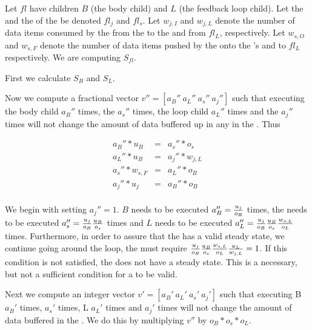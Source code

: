Let {\feedbackloop} $fl$ have children $B$ (the body child) and
$L$ (the feedback loop child). Let the {\joiner} and the
{\splitter} of the {\feedbackloop} be denoted $fl_j$ and $fl_s$.
Let $w_{j,I}$ and $w_{j,L}$ denote the number of data items
consumed by the {\joiner} from the {\Input} {\Channel} to the
{\feedbackloop} and from $fl_L$, respectively.  Let $w_{s,O}$ and
$w_{s,F}$ denote the number of data items pushed by the
{\splitter} onto the {\feedbackloop}'s {\Input} {\Channel} and
to $fl_L$ respectively.  We are computing $S_{fl}$.

First we calculate $S_{B}$ and $S_{L}$.

Now we compute a fractional vector $v'' = [a_B''\ a_L''\ a_s''\
a_j'']$ such that executing the body child $a_B''$ times, the
{\splitter} $a_s''$ times, the loop child $a_L''$ times and the
{\joiner} $a_j''$ times will not change the amount of data
buffered up in any {\Channel} in the {\feedbackloop}.  Thus

\begin{displaymath}
\begin{array}{rcl}
a_B'' * u_B & = & a_s'' * o_s \\
a_L'' * u_B & = & a_j'' * w_{j, L} \\
a_s'' * w_{s, F} & = & a_L'' * o_B \\
a_j'' * u_j & = & a_B'' * o_B \\
\end{array}
\end{displaymath}

We begin with setting $a_j'' = 1$. $B$ needs to be executed $a_B''
= {u_j \over o_B}$ times, the {\splitter} needs to be executed
$a_s'' = {u_j \over o_B}{u_B \over o_s}$ times and $L$ needs to be
executed $a_L'' = {u_j \over o_B}{u_B \over o_s}{w_{s,L} \over
o_L}$ times. Furthermore, in order to assure that the
{\feedbackloop} has a valid steady state, we continue going
around the loop, the {\joiner} must require ${u_j \over o_B}{u_B
\over o_s}{w_{s,L} \over o_L}{u_L \over w_{j,L}} = 1$.  If this
condition is not satisfied, the {\feedbackloop} does not have a
steady state. This is a necessary, but not a sufficient condition
for a {\feedbackloop} to be valid.

Next we compute an integer vector $v' = [a_B'\ a_L'\ a_s'\ a_j']$
such that executing B $a_B'$ times, {\splitter} $a_s'$ times, L
$a_L'$ times and {\joiner} $a_j'$ times will not change the amount
of data buffered in the {\splitjoin}. We do this by multiplying
$v''$ by $o_B * o_s * o_L$.

